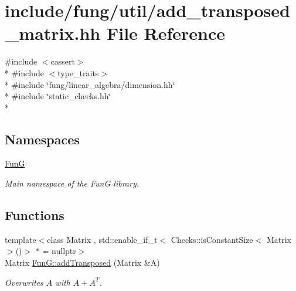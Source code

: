 \hypertarget{add__transposed__matrix_8hh}{\section{include/fung/util/add\-\_\-transposed\-\_\-matrix.hh File Reference}
\label{add__transposed__matrix_8hh}
}
{\ttfamily \#include $<$cassert$>$}\\*
{\ttfamily \#include $<$type\-\_\-traits$>$}\\*
{\ttfamily \#include \char`\"{}fung/linear\-\_\-algebra/dimension.\-hh\char`\"{}}\\*
{\ttfamily \#include \char`\"{}static\-\_\-checks.\-hh\char`\"{}}\\*
\subsection*{Namespaces}
\begin{DoxyCompactItemize}
\item 
\hyperlink{namespaceFunG}{Fun\-G}
\begin{DoxyCompactList}\small\item\em Main namespace of the Fun\-G library. \end{DoxyCompactList}\end{DoxyCompactItemize}
\subsection*{Functions}
\begin{DoxyCompactItemize}
\item 
{\footnotesize template$<$class Matrix , std\-::enable\-\_\-if\-\_\-t$<$ Checks\-::is\-Constant\-Size$<$ Matrix $>$()$>$ $\ast$  = nullptr$>$ }\\Matrix \hyperlink{namespaceFunG_a0211d0d26c669d56b5113fd2292902e5}{Fun\-G\-::add\-Transposed} (Matrix \&A)
\begin{DoxyCompactList}\small\item\em Overwrites $A$ with $A+A^T$. \end{DoxyCompactList}\end{DoxyCompactItemize}
